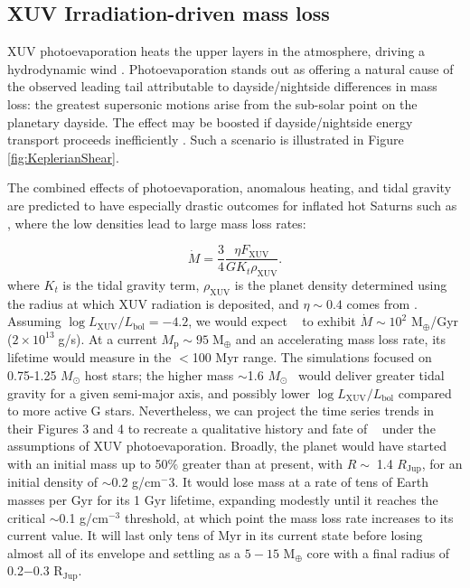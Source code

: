 \documentclass[twocolumn]{aastex631}
\newcommand{\hatp}{\object{HAT-P-67}~}
\newcommand{\hatpb}{\object{HAT-P-67 b}}
\begin{document}
\subsection{XUV Irradiation-driven mass loss}
XUV photoevaporation heats the upper layers in the atmosphere, driving a hydrodynamic wind \citep{2009ApJ...693...23M}.  Photoevaporation stands out as offering a natural cause of the observed leading tail attributable to dayside/nightside differences in mass loss: the greatest supersonic motions arise from the sub-solar point on the planetary dayside.  The effect may be boosted if dayside/nightside energy transport proceeds inefficiently \citep{2009ApJ...693...23M}.  Such a scenario is illustrated in Figure \ref{fig:KeplerianShear}.

The combined effects of photoevaporation, anomalous heating, and tidal gravity are predicted to have especially drastic outcomes for inflated hot Saturns \citep{2023ApJ...945L..36T} such as \hatpb, where the low densities lead to large mass loss rates:

\begin{equation}
    \dot{M} = \frac{3}{4}\frac{\eta F_\mathrm{XUV}}{G K_t \rho_\mathrm{XUV}}\label{thorn23Mdot}.
\end{equation}
 where $K_t$ is the tidal gravity term, $\rho_\mathrm{XUV}$ is the planet density determined using the radius at which XUV radiation is deposited, and $\eta \sim 0.4$ comes from \citet{2022A&A...663A.122C}.  Assuming $\log{L_\mathrm{XUV}/L_\mathrm{bol}}=-4.2$, we would expect \hatpb~ to exhibit $\dot{M}\sim10^2$ M$_\oplus$/Gyr ($2\times10^{13}\;$g/s). At a current $M_\mathrm{p}\sim95\;$M$_\oplus$ and an accelerating mass loss rate, its lifetime would measure in the $<$100 Myr range.  The \citet{2023ApJ...945L..36T} simulations focused on 0.75-1.25 $M_\odot$ host stars; the higher mass $\sim$1.6 $M_\odot$ \hatp would deliver greater tidal gravity for a given semi-major axis, and possibly lower $\log{L_\mathrm{XUV}/L_\mathrm{bol}}$ compared to more active G stars.  Nevertheless, we can project the time series trends in their Figures 3 and 4 to recreate a qualitative history and fate of \hatpb~ under the assumptions of XUV photoevaporation.  Broadly, the planet would have started with an initial mass up to 50$\%$ greater than at present, with $R\sim\;$1.4 $R_\mathrm{Jup}$, for an initial density of $\sim$0.2 g/cm$^-3$.  It would lose mass at a rate of tens of Earth masses per Gyr for its 1 Gyr lifetime, expanding modestly until it reaches the critical $\sim$0.1 g/cm$^{-3}$ threshold, at which point the mass loss rate increases to its current value.  It will last only tens of Myr in its current state before losing almost all of its envelope and settling as a $5-15$ M$_\oplus$ core with a final radius of 0.2$-$0.3 R$_\mathrm{Jup}$.
\end{document}

